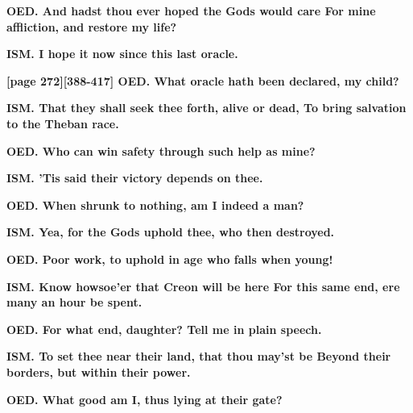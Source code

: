 \documentclass[11pt,letter]{book}
\begin{document}
\par \textbf{OED. And hadst thou ever hoped the Gods would care For mine affliction, and restore my life?}
\par 

\par \textbf{ISM. I hope it now since this last oracle.}
\par 

\par \textbf{[page 272][388-417] OED. What oracle hath been declared, my child?}
\par 

\par \textbf{ISM. That they shall seek thee forth, alive or dead, To bring salvation to the Theban race.}
\par 

\par \textbf{OED. Who can win safety through such help as mine?}
\par 

\par \textbf{ISM. ’Tis said their victory depends on thee.}
\par 

\par \textbf{OED. When shrunk to nothing, am I indeed a man?}
\par 

\par \textbf{ISM. Yea, for the Gods uphold thee, who then destroyed.}
\par 

\par \textbf{OED. Poor work, to uphold in age who falls when young!}
\par 

\par \textbf{ISM. Know howsoe’er that Creon will be here For this same end, ere many an hour be spent.}
\par 

\par \textbf{OED. For what end, daughter? Tell me in plain speech.}
\par 

\par \textbf{ISM. To set thee near their land, that thou may’st be Beyond their borders, but within their power.}
\par 

\par \textbf{OED. What good am I, thus lying at their gate?}
\par 
\end{document}

